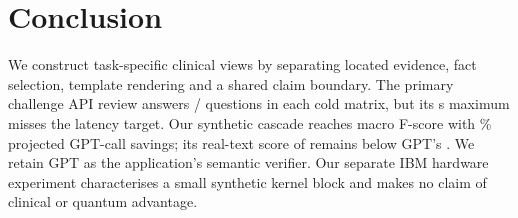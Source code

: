 \documentclass[10pt]{article}
\begin{document}
\FloatBarrier
\section{Conclusion}
We construct task-specific clinical views by separating located evidence, fact
selection, template rendering and a shared claim boundary. The primary challenge
API review answers \ReviewedAnswerPassed/\ReviewedAnswerTotal{} questions in each
cold matrix, but its \ReviewedColdSeconds{} s maximum misses the latency target.
Our synthetic cascade reaches \CascadeVerifierFscore{} macro F-score with
\CascadeSavedPercent{}\% projected GPT-call savings; its real-text score of
\CascadeRealFscore{} remains below GPT's \ProxyRealFscore{}. We retain GPT as the
application's semantic verifier. Our separate IBM hardware experiment characterises
a small synthetic kernel block and makes no claim of clinical or quantum advantage.

\FloatBarrier

\FloatBarrier


\end{document}
